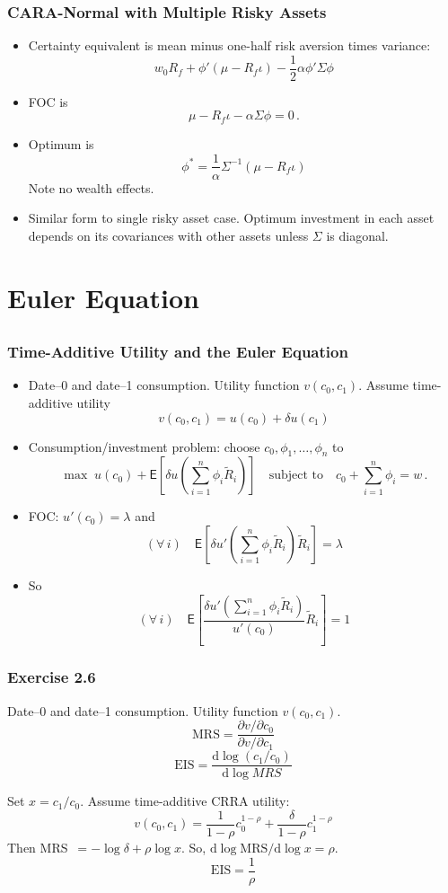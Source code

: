 \documentclass[10pt]{beamer}
\newcommand{\bi}{\begin{itemize}}
\newcommand{\ei}{\end{itemize}}
\newcommand{\im}{\item}
\newcommand{\D}{\mathrm{d}}
\newcommand{\mye}{\ensuremath{\mathsf{E}}}
\newcommand{\bfr}{\begin{frame}}
\newcommand{\tr}{\widetilde{R}}
\newcommand{\lb}{\left[}
\newcommand{\lp}{\left(}
\newcommand{\rb}{\right]}
\newcommand{\rp}{\right)}
\begin{document}
\bfr\frametitle{CARA-Normal with Multiple Risky Assets}
\bi
\im Certainty equivalent is mean minus one-half risk aversion times variance:
$$w_0R_f + \phi'(\mu-R_f\iota) - \frac{1}{2}\alpha \phi'\Sigma\phi$$
\im FOC is
$$\mu-R_f\iota - \alpha\Sigma\phi = 0\,.$$
\im Optimum is
$$\phi^* = \frac{1}{\alpha}\Sigma^{-1}(\mu-R_f\iota)$$
Note no wealth effects.
\im Similar form to single risky asset case.  Optimum investment in each asset depends on its covariances with other assets unless $\Sigma$ is diagonal.
\ei
\end{frame}



\section{Euler Equation}
\subsection{}

\bfr\frametitle{Time-Additive Utility and the Euler Equation}
\bi
\im Date--0 and date--1 consumption.  Utility function $v(c_0,c_1)$.  Assume time-additive utility
$$v(c_0,c_1) = u(c_0) + \delta u(c_1)$$
\im Consumption/investment problem:  choose $c_0, \phi_1, \ldots, \phi_n$ to 
$$\max \;u(c_0) +  \mye\lb \delta u\lp \sum_{i=1}^n \phi_i\tr_i \rp \rb \quad \text{subject to} \quad c_0 + \sum_{i=1}^n \phi_i = w\,.$$
\im FOC: $u'(c_0) = \lambda$ and 
$$(\forall \,i) \quad  \mye\lb \delta u'\lp \sum_{i=1}^n \phi_i\tr_i \rp \tr_i\rb = \lambda$$
\im So
$$(\forall \,i) \quad \mye\lb \frac{\delta u'\lp \sum_{i=1}^n \phi_i\tr_i \rp}{u'(c_0)} \tr_i\rb = 1$$
\ei
\end{frame}



\bfr\frametitle{Exercise 2.6}
Date--0 and date--1 consumption.  Utility function $v(c_0,c_1)$.  
$$\text{MRS} = \frac{\partial v/\partial c_0}{\partial v/\partial c_1}$$
$$\text{EIS} = \frac{\D \log (c_1/c_0)}{\D \log MRS}$$

Set $x=c_1/c_0$.  Assume time-additive CRRA utility:
$$v(c_0,c_1) = \frac{1}{1-\rho}c_0^{1-\rho} + \frac{\delta}{1-\rho}c_1^{1-\rho}$$
Then MRS $\,= -\log \delta + \rho \log x$.  So, $\D \log \text{MRS} /\D \log x = \rho$.
$$\text{EIS}  = \frac{1}{\rho}$$
\end{frame}
\end{document}
